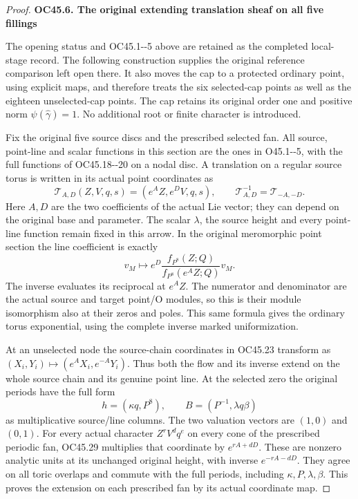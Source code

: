 \begin{proof}
\par

\medskip\noindent\textbf{OC45.6. The original extending translation sheaf on all five fillings}

\par\nobreak

The opening status and OC45.1-\/-5 above are retained as the completed
local-stage record. The following construction supplies the original
reference comparison left open there. It also moves the cap to a
protected ordinary point, using explicit maps, and therefore treats
the six selected-cap points as well as the eighteen unselected-cap
points. The cap retains its original order one and positive norm
\(\psi(\widehat\gamma)=1\). No additional root or finite character is
introduced.

Fix the original five source discs and the prescribed selected fan.
All source, point-line and scalar functions in this section are the
ones in O45.1-\/-5, with the full functions of OC45.18-\/-20 on a nodal
disc. A translation on a regular source torus is written in its
actual point coordinates as
\[
 \mathcal T_{A,D}(Z,V,q,s)
       =(e^A Z,e^D V,q,s),\qquad
 \mathcal T_{A,D}^{-1}=\mathcal T_{-A,-D}.
 \tag{OC45.29}
\]
Here \(A,D\) are the two coefficients of the actual Lie vector;
they can depend on the original base and parameter. The scalar
\(\lambda\), the source height and every point-line function remain
fixed in this arrow. In the original meromorphic point section the
line coefficient is exactly
\[
 v_M\longmapsto e^D
       \frac{f_{P^8}(Z;Q)}{f_{P^8}(e^A Z;Q)}v_M.
 \tag{OC45.30}
\]
The inverse evaluates its reciprocal at \(e^A Z\). The numerator and
denominator are the actual source and target point/O modules, so
this is their module isomorphism also at their zeros and poles.
This same formula gives the ordinary torus exponential, using the
complete inverse marked uniformization.

At an unselected node the source-chain coordinates in OC45.23
transform as \((X_i,Y_i)\mapsto(e^A X_i,e^{-A}Y_i)\).
Thus both the flow and its inverse extend on the whole source
chain and its genuine point line. At the selected zero the original
periods have the full form
\[
 h=(\kappa q,P^8),\qquad
 B=(P^{-1},\lambda q\beta)
 \tag{OC45.31}
\]
as multiplicative source/line columns. The two valuation vectors
are \((1,0)\) and \((0,1)\). For every actual character
\(Z^rV^d q^e\) on every cone of the prescribed periodic fan,
OC45.29 multiplies that coordinate by \(e^{rA+dD}\).
These are nonzero analytic units at its unchanged original height,
with inverse \(e^{-rA-dD}\). They agree on all toric overlaps and
commute with the full periods, including \(\kappa,P,\lambda,\beta\).
This proves the extension on each prescribed fan by its actual
coordinate map.


\end{proof}
